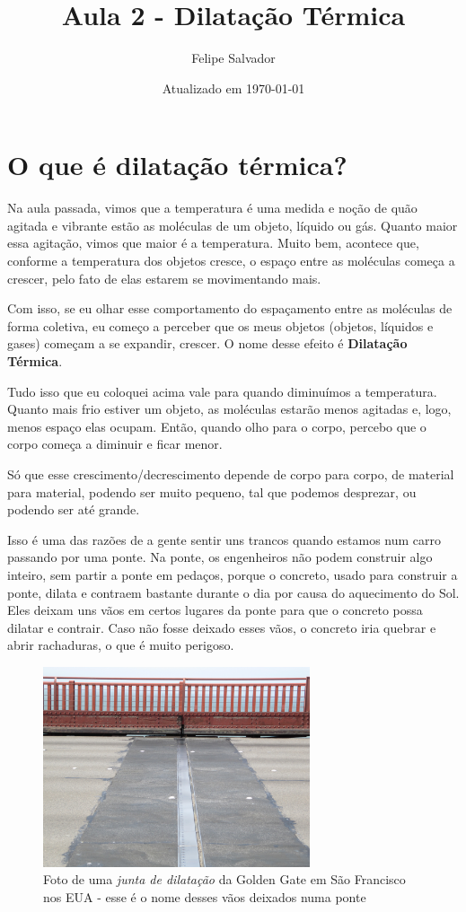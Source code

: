 \documentclass[12pt]{extarticle}
\title{Aula 2 - Dilatação Térmica}
\author{Felipe Salvador}
\date{Atualizado em \today}
\newcommand{\<}{\langle}
\renewcommand{\>}{\rangle}
\theoremstyle{definition}
\begin{document}
\maketitle

\section{O que é dilatação térmica?}

Na aula passada, vimos que a temperatura é uma medida e noção de quão agitada e vibrante estão as moléculas de um objeto, líquido ou gás. Quanto maior essa agitação, vimos que maior é a temperatura. Muito bem, acontece que, conforme a temperatura dos objetos cresce, o espaço entre as moléculas começa a crescer, pelo fato de elas estarem se movimentando mais. 

Com isso, se eu olhar esse comportamento do espaçamento entre as moléculas de forma coletiva, eu começo a perceber que os meus objetos (objetos, líquidos e gases) começam a se expandir, crescer. O nome desse efeito é \textbf{Dilatação Térmica}.

Tudo isso que eu coloquei acima vale para quando diminuímos a temperatura. Quanto mais frio estiver um objeto, as moléculas estarão menos agitadas e, logo, menos espaço elas ocupam. Então, quando olho para o corpo, percebo que o corpo começa a diminuir e ficar menor.


Só que esse crescimento/decrescimento depende de corpo para corpo, de material para material, podendo ser muito pequeno, tal que podemos desprezar, ou podendo ser até grande.

Isso é uma das razões de a gente sentir uns trancos quando estamos num carro passando por uma ponte. Na ponte, os engenheiros não podem construir algo inteiro, sem partir a ponte em pedaços, porque o concreto, usado para construir a ponte, dilata e contraem bastante durante o dia por causa do aquecimento do Sol. Eles deixam uns vãos em certos lugares da ponte para que o concreto possa dilatar e contrair. Caso não fosse deixado esses vãos, o concreto iria quebrar e abrir rachaduras, o que é muito perigoso.

\begin{figure}[H]
    \centering
    \includegraphics[width=0.7\textwidth]{Expansion_joint_Golden_Gate_Bridge.jpg}
    \caption{Foto de uma \textit{junta de dilatação} da Golden Gate em São Francisco nos EUA - esse é o nome desses vãos deixados numa ponte}
    \label{fig:ex_1}
\end{figure}
\end{document}
